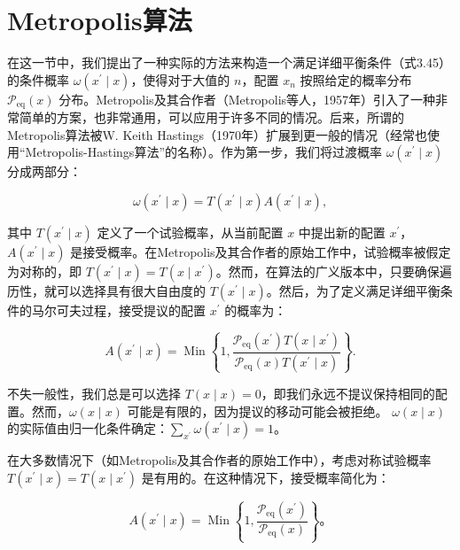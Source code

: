 \documentclass{article}
\begin{document}
\section{Metropolis算法}

在这一节中，我们提出了一种实际的方法来构造一个满足详细平衡条件（式3.45）的条件概率 $\omega\left(x^{\prime} \mid x\right)$，使得对于大值的 $n$，配置 $x_{n}$ 按照给定的概率分布 $\mathcal{P}_{\mathrm{eq}}(x)$ 分布。Metropolis及其合作者（Metropolis等人，1957年）引入了一种非常简单的方案，也非常通用，可以应用于许多不同的情况。后来，所谓的Metropolis算法被W. Keith Hastings（1970年）扩展到更一般的情况（经常也使用“Metropolis-Hastings算法”的名称）。作为第一步，我们将过渡概率 $\omega\left(x^{\prime} \mid x\right)$ 分成两部分：

\[
\omega\left(x^{\prime} \mid x\right)=T\left(x^{\prime} \mid x\right) A\left(x^{\prime} \mid x\right),
\]

其中 $T\left(x^{\prime} \mid x\right)$ 定义了一个试验概率，从当前配置 $x$ 中提出新的配置 $x^{\prime}$，$A\left(x^{\prime} \mid x\right)$ 是接受概率。在Metropolis及其合作者的原始工作中，试验概率被假定为对称的，即 $T\left(x^{\prime} \mid x\right)=T\left(x \mid x^{\prime}\right)$。然而，在算法的广义版本中，只要确保遍历性，就可以选择具有很大自由度的 $T\left(x^{\prime} \mid x\right)$。然后，为了定义满足详细平衡条件的马尔可夫过程，接受提议的配置 $x^{\prime}$ 的概率为：

\[
A\left(x^{\prime} \mid x\right)=\operatorname{Min}\left\{1, \frac{\mathcal{P}_{\mathrm{eq}}\left(x^{\prime}\right) T\left(x \mid x^{\prime}\right)}{\mathcal{P}_{\mathrm{eq}}(x) T\left(x^{\prime} \mid x\right)}\right\}.
\]

不失一般性，我们总是可以选择 $T(x \mid x)=0$，即我们永远不提议保持相同的配置。然而，$\omega(x \mid x)$ 可能是有限的，因为提议的移动可能会被拒绝。 $\omega(x \mid x)$ 的实际值由归一化条件确定：$\sum_{x^{\prime}} \omega\left(x^{\prime} \mid x\right)=1$。

在大多数情况下（如Metropolis及其合作者的原始工作中），考虑对称试验概率 $T\left(x^{\prime} \mid x\right)=T\left(x \mid x^{\prime}\right)$ 是有用的。在这种情况下，接受概率简化为：

\[
A\left(x^{\prime} \mid x\right)=\operatorname{Min}\left\{1, \frac{\mathcal{P}_{\mathrm{eq}}\left(x^{\prime}\right)}{\mathcal{P}_{\mathrm{eq}}(x)}\right\}。
\]
\end{document}
